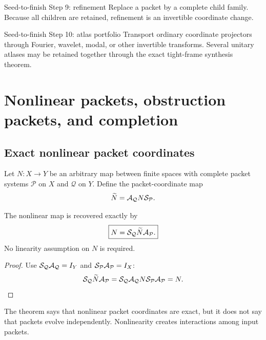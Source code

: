 
\begin{stepbox}{Seed-to-finish Step 9: refinement}
Replace a packet by a complete child family.  Because all children are retained, refinement is an invertible coordinate change.
\end{stepbox}

\begin{stepbox}{Seed-to-finish Step 10: atlas portfolio}
Transport ordinary coordinate projectors through Fourier, wavelet, modal, or other invertible transforms.  Several unitary atlases may be retained together through the exact tight-frame synthesis theorem.
\end{stepbox}

\chapter{Nonlinear packets, obstruction packets, and completion}\label{ch:nonlinear-completion}

\section{Exact nonlinear packet coordinates}
Let $N:X\to Y$ be an arbitrary map between finite spaces with complete packet systems $\mathcal P$ on $X$ and $\mathcal Q$ on $Y$.  Define the packet-coordinate map
\[
\widetilde N
=
\mathcal A_{\mathcal Q}N\mathcal S_{\mathcal P}.
\]

\begin{theorem}\label{thm:nonlinear-conjugacy}
The nonlinear map is recovered exactly by
\[
\boxed{
N
=
\mathcal S_{\mathcal Q}\widetilde N\mathcal A_{\mathcal P}.
}
\]
No linearity assumption on $N$ is required.
\end{theorem}

\begin{proof}
Use $\mathcal S_{\mathcal Q}\mathcal A_{\mathcal Q}=I_Y$ and $\mathcal S_{\mathcal P}\mathcal A_{\mathcal P}=I_X$:
\[
\mathcal S_{\mathcal Q}\widetilde N\mathcal A_{\mathcal P}
=
\mathcal S_{\mathcal Q}\mathcal A_{\mathcal Q}
N
\mathcal S_{\mathcal P}\mathcal A_{\mathcal P}
=N.
\]
\end{proof}

The theorem says that nonlinear packet coordinates are exact, but it does not say that packets evolve independently.  Nonlinearity creates interactions among input packets.

